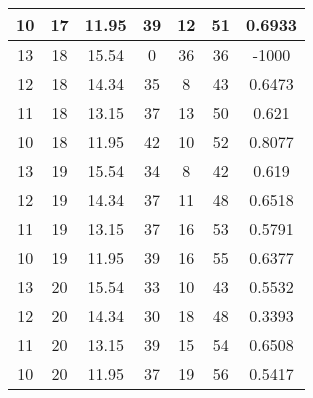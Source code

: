 \documentclass[letterpaper, 12pt]{article}
\begin{document}
\begin{longtable}{|c|c|c|c|c|c|c|}
\hline
10 & 17 & 11.95 & 39 & 12 & 51 & 0.6933 \\
\hline
13 & 18 & 15.54 & 0 & 36 & 36 & -1000 \\
\hline
12 & 18 & 14.34 & 35 & 8 & 43 & 0.6473 \\
\hline
11 & 18 & 13.15 & 37 & 13 & 50 & 0.621 \\
\hline
10 & 18 & 11.95 & 42 & 10 & 52 & 0.8077 \\
\hline
13 & 19 & 15.54 & 34 & 8 & 42 & 0.619 \\
\hline
12 & 19 & 14.34 & 37 & 11 & 48 & 0.6518 \\
\hline
11 & 19 & 13.15 & 37 & 16 & 53 & 0.5791 \\
\hline
10 & 19 & 11.95 & 39 & 16 & 55 & 0.6377 \\
\hline
13 & 20 & 15.54 & 33 & 10 & 43 & 0.5532 \\
\hline
12 & 20 & 14.34 & 30 & 18 & 48 & 0.3393 \\
\hline
11 & 20 & 13.15 & 39 & 15 & 54 & 0.6508 \\
\hline
10 & 20 & 11.95 & 37 & 19 & 56 & 0.5417 \\
\hline
\end{longtable}
\end{document}
